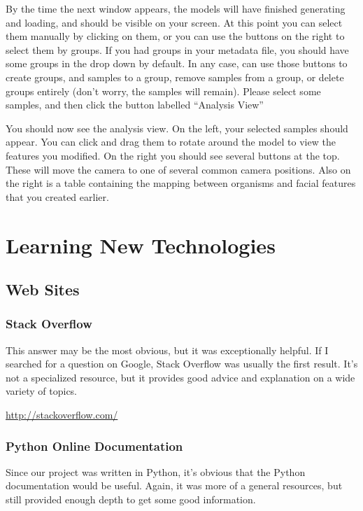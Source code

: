\documentclass[letterpaper,10pt, onecolumn, draftclsnofoot]{IEEEtran}
\begin{document}
By the time the next window appears, the models will have finished generating and loading, and should be visible on your screen. At this point you can select them manually by clicking on them, or you can use the buttons on the right to select them by groups. If you had groups in your metadata file, you should have some groups in the drop down by default. In any case, can use those buttons to create groups, and samples to a group, remove samples from a group, or delete groups entirely (don't worry, the samples will remain). Please select some samples, and then click the button labelled ``Analysis View''

You should now see the analysis view. On the left, your selected samples should appear. You can click and drag them to rotate around the model to view the features you modified. On the right you should see several buttons at the top. These will move the camera to one of several common camera positions. Also on the right is a table containing the mapping between organisms and facial features that you created earlier.

\section{Learning New Technologies}

\subsection{Web Sites}

\subsubsection{Stack Overflow}
This answer may be the most obvious, but it was exceptionally helpful. If I searched for a question on Google, Stack Overflow was usually the first result. It's not a specialized resource, but it provides good advice and explanation on a wide variety of topics.

\url{http://stackoverflow.com/}

\subsubsection{Python Online Documentation}

Since our project was written in Python, it's obvious that the Python documentation would be useful. Again, it was more of a general resources, but still provided enough depth to get some good information.
\end{document}
